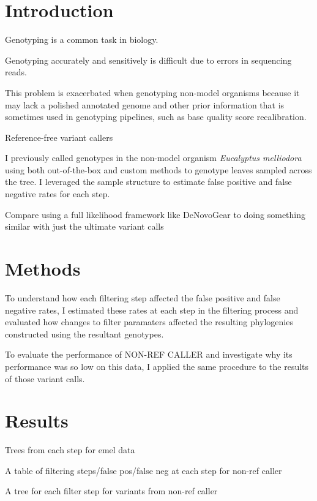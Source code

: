 \documentclass{article}
\begin{document}
\linenumbers

\section{Introduction}
\begin{outline}
	\item Genotyping is a common task in biology.
	\begin{outline}
		\item Genotyping accurately and sensitively is difficult due to errors in sequencing reads.
		\item This problem is exacerbated when genotyping non-model organisms because it may lack a polished annotated genome and other prior information that is sometimes used in genotyping pipelines, such as base quality score recalibration.
	\end{outline}
	\item Reference-free variant callers
	\begin{outline}
	\end{outline}
	\item I previously called genotypes in the non-model organism \textit{Eucalyptus melliodora} using both out-of-the-box and custom methods to genotype leaves sampled across the tree. I leveraged the sample structure to estimate false positive and false negative rates for each step.
	\item Compare using a full likelihood framework like DeNovoGear to doing something similar with just the ultimate variant calls

\end{outline}

\section{Methods}
\begin{outline}
	\item To understand how each filtering step affected the false positive and false negative rates, I estimated these rates at each step in the filtering process and evaluated how changes to filter paramaters affected the resulting phylogenies constructed using the resultant genotypes.
	\item To evaluate the performance of NON-REF CALLER and investigate why its performance was so low on this data, I applied the same procedure to the results of those variant calls.
\end{outline}

\section{Results}
\begin{outline}
	\item Trees from each step for emel data
	\item A table of filtering steps/false pos/false neg at each step for non-ref caller
	\item A tree for each filter step for variants from non-ref caller
\end{outline}
\end{document}
